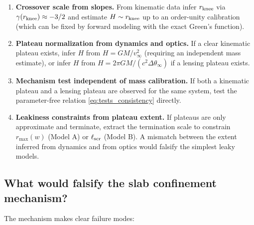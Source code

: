 \documentclass[11pt]{article}
\begin{document}
\begin{enumerate}
\item \textbf{Crossover scale from slopes.}
From kinematic data infer $r_{\rm knee}$ via $\gamma(r_{\rm knee})\approx -3/2$ and estimate
$H\sim r_{\rm knee}$ up to an order-unity calibration (which can be fixed by forward modeling with
the exact Green's function).

\item \textbf{Plateau normalization from dynamics and optics.}
If a clear kinematic plateau exists, infer $H$ from $H=GM/v_\infty^2$ (requiring an independent mass
estimate), or infer $H$ from $H=2\pi GM/(c^2\Delta\theta_\infty)$ if a lensing plateau exists.

\item \textbf{Mechanism test independent of mass calibration.}
If both a kinematic plateau and a lensing plateau are observed for the same system, test the
parameter-free relation \eqref{eq:tests_consistency} directly.

\item \textbf{Leakiness constraints from plateau extent.}
If plateaus are only approximate and terminate, extract the termination scale to constrain
$r_{\max}(w)$ (Model A) or $\ell_{\rm scr}$ (Model B).  A mismatch between the extent inferred from
dynamics and from optics would falsify the simplest leaky models.
\end{enumerate}

\subsection{What would falsify the slab confinement mechanism?}
\label{sec:tests_falsify}

The mechanism makes clear failure modes:
\end{document}
